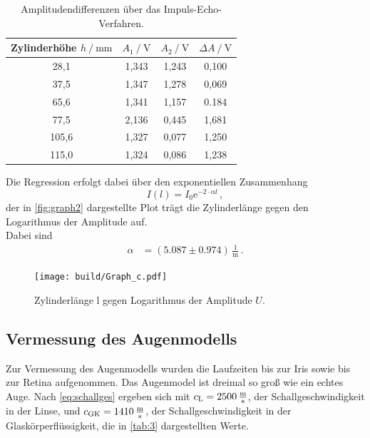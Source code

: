\begin{table}
    \centering
    \caption{Amplitudendifferenzen über das Impuls-Echo-Verfahren.}
    \label{tab:2} 
    \begin{tabular}{c c c c}
    \toprule 
    {Zylinderhöhe $h \mathbin{/} \unit{\milli\meter}$} & {$A_1 \mathbin{/} \unit{\volt}$} & {$A_2 \mathbin{/} \unit{\volt}$} & {$\Delta A \mathbin{/} \unit{\volt}$}\\
    \midrule 
     28,1       &       1,343       &        1,243      &       0,100       \\       
     37,5       &       1,347       &        1,278      &       0,069       \\       
     65,6       &       1,341       &        1,157      &       0.184       \\       
     77,5       &       2,136       &        0,445      &       1,681       \\       
    105,6       &       1,327       &        0,077      &       1,250       \\
    115,0       &       1,324       &        0,086      &       1,238       \\               
    \bottomrule
    \end{tabular}  
\end{table}

Die Regression erfolgt dabei über den exponentiellen Zusammenhang
\begin{equation*}
    I(l) = I_0 \text{e}^{-2 \cdot \alpha l} \,,
\end{equation*}
der in \autoref{fig:graph2} dargestellte Plot trägt die Zylinderlänge gegen den Logarithmus der Amplitude auf. \\
Dabei sind
\begin{align*}
    \alpha  &= (5.087 \pm 0.974) \,\frac{1}{\unit{\meter}} \,.
\end{align*}

\begin{figure}[H]
    \centering
    \texttt{[image: build/Graph\_c.pdf]}
    \caption{Zylinderlänge l gegen Logarithmus der Amplitude $U$.}
    \label{fig:graph2}
\end{figure}


\subsection{Vermessung des Augenmodells}


Zur Vermessung des Augenmodells wurden die Laufzeiten bis zur Iris sowie bis zur Retina aufgenommen. Das Augenmodel ist dreimal so groß wie ein echtes Auge. 
Nach \eqref{eq:schallges} ergeben sich mit $c_\text{L} = 2500 \,\unit{\frac{\meter}{\second}}$, der Schallgeschwindigkeit in der Linse, und
$c_\text{GK} = 1410 \,\unit{\frac{\meter}{\second}}$, der Schallgeschwindigkeit in der Glaskörperflüssigkeit, die in \autoref{tab:3} dargestellten Werte.


